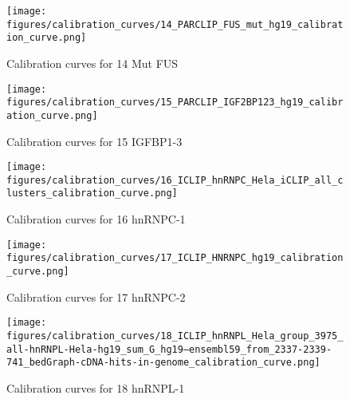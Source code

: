 \documentclass[11pt]{article}
\begin{document}
    
    
    \begin{figure}
        \begin{center}
            \texttt{[image: figures/calibration\_curves/14\_PARCLIP\_FUS\_mut\_hg19\_calibration\_curve.png]}
            \caption{Calibration curves for 14 Mut FUS}
            \label{fig:calibration14 Mut FUS}
        \end{center}
    \end{figure}

    
    
    \begin{figure}
        \begin{center}
            \texttt{[image: figures/calibration\_curves/15\_PARCLIP\_IGF2BP123\_hg19\_calibration\_curve.png]}
            \caption{Calibration curves for 15 IGFBP1-3}
            \label{fig:calibration15 IGFBP1-3}
        \end{center}
    \end{figure}

    
    
    \begin{figure}
        \begin{center}
            \texttt{[image: figures/calibration\_curves/16\_ICLIP\_hnRNPC\_Hela\_iCLIP\_all\_clusters\_calibration\_curve.png]}
            \caption{Calibration curves for 16 hnRNPC-1}
            \label{fig:calibration16 hnRNPC-1}
        \end{center}
    \end{figure}

    
    
    \begin{figure}
        \begin{center}
            \texttt{[image: figures/calibration\_curves/17\_ICLIP\_HNRNPC\_hg19\_calibration\_curve.png]}
            \caption{Calibration curves for 17 hnRNPC-2}
            \label{fig:calibration17 hnRNPC-2}
        \end{center}
    \end{figure}

    
    
    \begin{figure}
        \begin{center}
            \texttt{[image: figures/calibration\_curves/18\_ICLIP\_hnRNPL\_Hela\_group\_3975\_all-hnRNPL-Hela-hg19\_sum\_G\_hg19--ensembl59\_from\_2337-2339-741\_bedGraph-cDNA-hits-in-genome\_calibration\_curve.png]}
            \caption{Calibration curves for 18 hnRNPL-1}
            \label{fig:calibration18 hnRNPL-1}
        \end{center}
    \end{figure}
\end{document}
